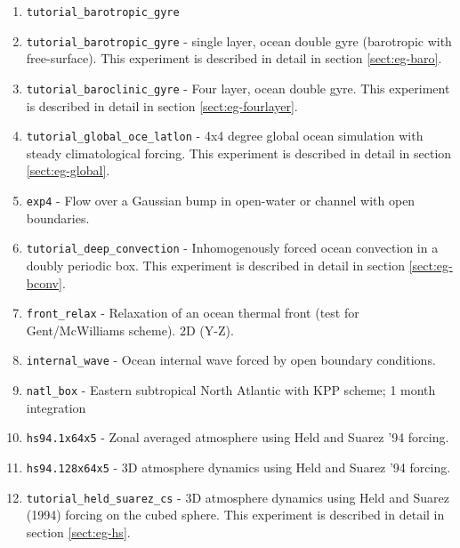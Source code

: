 \begin{enumerate}
  
\item \texttt{tutorial\_barotropic\_gyre}

\item \texttt{tutorial\_barotropic\_gyre} - single layer, ocean double
  gyre (barotropic with free-surface). This experiment is described in
  detail in section \ref{sect:eg-baro}.

\item \texttt{tutorial\_baroclinic\_gyre} - Four layer, ocean double
  gyre. This experiment is described in detail in section
  \ref{sect:eg-fourlayer}.

\item \texttt{tutorial\_global\_oce\_latlon} - 4x4 degree global ocean
  simulation with steady climatological forcing. This experiment is
  described in detail in section \ref{sect:eg-global}.

\item \texttt{exp4} - Flow over a Gaussian bump in open-water or
  channel with open boundaries.
  
\item \texttt{tutorial\_deep\_convection} - Inhomogenously forced
  ocean convection in a doubly periodic box. This experiment is
  described in detail in section \ref{sect:eg-bconv}.

\item \texttt{front\_relax} - Relaxation of an ocean thermal front
  (test for Gent/McWilliams scheme). 2D (Y-Z).

\item \texttt{internal\_wave} - Ocean internal wave forced by open
  boundary conditions.
  
\item \texttt{natl\_box} - Eastern subtropical North Atlantic with KPP
  scheme; 1 month integration
  
\item \texttt{hs94.1x64x5} - Zonal averaged atmosphere using Held and
  Suarez '94 forcing.
  
\item \texttt{hs94.128x64x5} - 3D atmosphere dynamics using Held and
  Suarez '94 forcing.
  
\item \texttt{tutorial\_held\_suarez\_cs} - 3D atmosphere dynamics
  using Held and Suarez (1994) forcing on the cubed sphere.  This
  experiment is described in detail in section \ref{sect:eg-hs}.
  

\end{enumerate}
